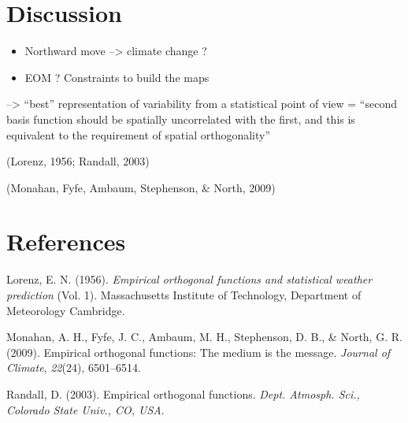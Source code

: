 \documentclass[
  english,
  man]{apa6}
\begin{document}
\hypertarget{discussion}{%
\section{Discussion}\label{discussion}}

\begin{itemize}
\item
  Northward move --\textgreater{} climate change ?
\item
  EOM ? Constraints to build the maps
\end{itemize}

--\textgreater{} \enquote{best} representation of variability from a statistical point of view = \enquote{second basis function should be spatially uncorrelated with the first, and this is equivalent to the requirement of spatial orthogonality}

(Lorenz, 1956; Randall, 2003)

(Monahan, Fyfe, Ambaum, Stephenson, \& North, 2009)

\newpage

\hypertarget{references}{%
\section{References}\label{references}}

\begingroup
\setlength{\parindent}{-0.5in}
\setlength{\leftskip}{0.5in}

\hypertarget{refs}{}
\leavevmode\hypertarget{ref-lorenz1956empirical}{}%
Lorenz, E. N. (1956). \emph{Empirical orthogonal functions and statistical weather prediction} (Vol. 1). Massachusetts Institute of Technology, Department of Meteorology Cambridge.

\leavevmode\hypertarget{ref-monahan2009empirical}{}%
Monahan, A. H., Fyfe, J. C., Ambaum, M. H., Stephenson, D. B., \& North, G. R. (2009). Empirical orthogonal functions: The medium is the message. \emph{Journal of Climate}, \emph{22}(24), 6501--6514.

\leavevmode\hypertarget{ref-randall2003empirical}{}%
Randall, D. (2003). Empirical orthogonal functions. \emph{Dept. Atmosph. Sci., Colorado State Univ., CO, USA}.

\endgroup
\end{document}
